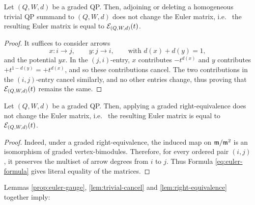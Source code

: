 \begin{lemma}\label{lem:trivial-cancel}
Let $(Q,W,d)$ be a graded QP. Then, adjoining or deleting a homogeneous trivial QP summand to $(Q,W,d)$ does not change the Euler matrix, i.e.~ the resulting Euler matrix is equal to $\mathcal E_{(Q,W,d)}(t)$.
\end{lemma}

\begin{proof}
It suffices to consider arrows
\[
 x:i\to j,
 \qquad
 y:j\to i,
 \qquad\mbox{with }
 d(x)+d(y)=1,
\]
and the potential \(yx\).  In the \((j,i)\)-entry, \(x\) contributes
\(-t^{d(x)}\) and \(y\) contributes
\(+t^{1-d(y)}=+t^{d(x)}\), and so these contributions cancel. The two contributions in the
\((i,j)\)-entry cancel similarly, and no other entries change, thus proving that $\mathcal E_{(Q,W,d)}(t)$ remains the same.
\end{proof}

\begin{lemma}\label{lem:right-equivalence}
Let $(Q,W,d)$ be a graded QP. Then, applying a graded right-equivalence does not change the Euler matrix, i.e.~ the resulting Euler matrix is equal to $\mathcal E_{(Q,W,d)}(t)$.
\end{lemma}

\begin{proof}
Indeed, under a graded right-equivalence, the induced map on
\(\mathfrak m/\mathfrak m^2\) is an isomorphism of graded vertex-bimodules.  Therefore, for
every ordered pair \((i,j)\), it preserves the multiset of arrow degrees
from \(i\) to \(j\). Thus Formula \eqref{eq:euler-formula} gives literal equality
of the matrices.
\end{proof}

Lemmas \ref{prop:euler-gauge}, \ref{lem:trivial-cancel} and \ref{lem:right-equivalence} together imply:


